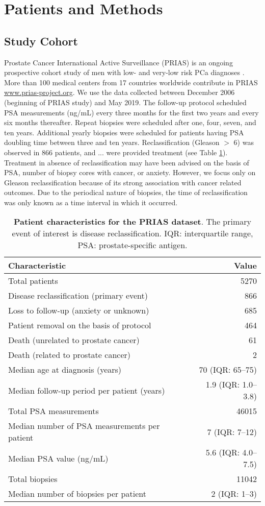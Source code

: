 \section{Patients and Methods}

\subsection{Study Cohort}
Prostate Cancer International Active Surveillance (PRIAS) is an ongoing prospective cohort study of men with low- and very-low risk PCa diagnoses \cite{bul2013active}. More than 100 medical centers from 17 countries worldwide contribute in PRIAS \url{www.prias-project.org}. We use the data collected between December 2006 (beginning of PRIAS study) and May 2019. The follow-up protocol scheduled PSA measurements (ng/mL) every three months for the first two years and every six months thereafter. Repeat biopsies were scheduled after one, four, seven, and ten years. Additional yearly biopsies were scheduled for patients having PSA doubling time between three and ten years. Reclassification (Gleason $>$ 6) was observed in 866 patients, and ... were provided treatment (see Table \ref{table:prias_summary}). Treatment in absence of reclassification may have been advised on the basis of PSA, number of biopsy cores with cancer, or anxiety. However, we focus only on Gleason reclassification because of its strong association with cancer related outcomes. Due to the periodical nature of biopsies, the time of reclassification was only known as a time interval in which it occurred.

\begin{table}
\small\sf\centering
\caption{\textbf{Patient characteristics for the PRIAS dataset}. The primary event of interest is disease reclassification. IQR: interquartile range, PSA: prostate-specific antigen.}
\label{table:prias_summary}
\begin{tabular}{lr}
\hline
\hline
Characteristic & Value\\
\hline
Total patients & 5270\\
Disease reclassification (primary event) & 866\\
Loss to follow-up (anxiety or unknown) & 685\\
Patient removal on the basis of protocol & 464\\
Death (unrelated to prostate cancer) & 61\\
Death (related to prostate cancer) & 2\\
\hline
Median age at diagnosis (years) & 70 (IQR: 65--75)\\
Median follow-up period per patient (years) &  1.9 (IQR: 1.0--3.8)\\
Total PSA measurements & 46015\\
Median number of PSA measurements per patient &  7 (IQR: 7--12)\\
Median PSA value (ng/mL) & 5.6 (IQR: 4.0--7.5)\\
Total biopsies & 11042\\
Median number of biopsies per patient &  2 (IQR: 1--3)\\
\hline
\end{tabular}
\end{table}